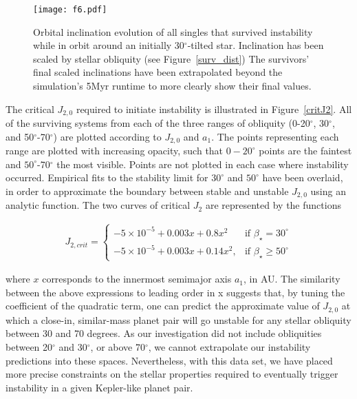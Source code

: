 \documentclass[twocolumn]{aastex63}
\begin{document}
\begin{figure}
\centering
\texttt{[image: f6.pdf]}
\caption{Orbital inclination evolution of all singles that survived instability while in orbit around an initially 30$^{\circ}$-tilted star. Inclination has been scaled by stellar obliquity (see Figure~\ref{surv_dist}) The survivors’ final scaled inclinations have been extrapolated beyond the simulation’s 5Myr runtime to more clearly show their final values. }\label{surv_30}
\end{figure}

The critical $J_{2,0}$ required to initiate instability is illustrated in Figure~\ref{critJ2}. All of the surviving systems from each of the three ranges of obliquity (0-20$^{\circ}$, 30$^{\circ}$, and 50$^{\circ}$-70$^{\circ}$) are plotted according to \(J_{2,0}\) and \(a_1\). The points representing each range are plotted with increasing opacity, such that $0-20^\circ$ points are the faintest and $50^\circ$-70$^{\circ}$ the most visible. Points are not plotted in each case where instability occurred. Empirical fits to the stability limit for $30^\circ$ and $50^\circ$ have been overlaid, in order to approximate the boundary between stable and unstable \(J_{2,0}\) using an analytic function. The two curves of critical $J_2$ are represented by the functions

\begin{align}\label{J2fits}
J_{2,crit}= 
\begin{cases}
   -5\times 10^{-5}+0.003x+0.8x^2& \text{if } \beta_\star=30^\circ\\
   -5\times 10^{-5}+0.003x+0.14x^2,    & \text{if } \beta_\star\geq50^\circ
\end{cases}
\end{align}

where $x$ corresponds to the innermost semimajor axis $a_1$, in AU. The similarity between the above expressions to leading order in x suggests that, by tuning the coefficient of the quadratic term, one can predict the approximate value of \(J_{2,0}\) at which a close-in, similar-mass planet pair will go unstable for any stellar obliquity between 30 and 70 degrees. As our investigation did not include obliquities between 20$^{\circ}$ and 30$^{\circ}$, or above 70$^{\circ}$, we cannot extrapolate our instability predictions into these spaces. Nevertheless, with this data set, we have placed more precise constraints on the stellar properties required to eventually trigger instability in a given Kepler-like planet pair.
\end{document}
